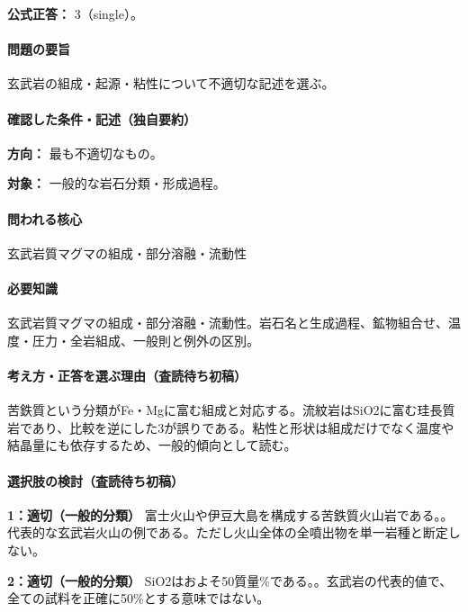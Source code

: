 \textbf{公式正答：} 3（single）。

\paragraph{問題の要旨} 玄武岩の組成・起源・粘性について不適切な記述を選ぶ。

\paragraph{確認した条件・記述（独自要約）}\mbox{}\par

\noindent\textbf{方向：} 最も不適切なもの。\par

\noindent\textbf{対象：} 一般的な岩石分類・形成過程。\par

\paragraph{問われる核心} 玄武岩質マグマの組成・部分溶融・流動性

\paragraph{必要知識} 玄武岩質マグマの組成・部分溶融・流動性。岩石名と生成過程、鉱物組合せ、温度・圧力・全岩組成、一般則と例外の区別。

\paragraph{考え方・正答を選ぶ理由（査読待ち初稿）} 苦鉄質という分類がFe・Mgに富む組成と対応する。流紋岩はSiO2に富む珪長質岩であり、比較を逆にした3が誤りである。粘性と形状は組成だけでなく温度や結晶量にも依存するため、一般的傾向として読む。

\paragraph{選択肢の検討（査読待ち初稿）}\mbox{}\par

\noindent\textbf{1：適切（一般的分類）} 富士火山や伊豆大島を構成する苦鉄質火山岩である。。代表的な玄武岩火山の例である。ただし火山全体の全噴出物を単一岩種と断定しない。\par

\noindent\textbf{2：適切（一般的分類）} SiO2はおよそ50質量\%である。。玄武岩の代表的値で、全ての試料を正確に50\%とする意味ではない。\par

